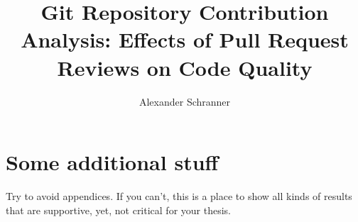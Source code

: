 \documentclass[bachelor]{padsthesis}
\begin{document}
\author{Alexander Schranner}
\title{Git Repository Contribution Analysis: Effects of Pull Request Reviews on Code Quality}

\maketitle

\frontmatter

%



\tableofcontents
\listoffigures
\listoftables

\mainmatter





% 



% 









\appendix
\chapter{Some additional stuff}
Try to avoid appendices.
If you can't, this is a place to show all kinds of results that are supportive, yet, not critical for your thesis.

\backmatter
\printbibliography
\end{document}
